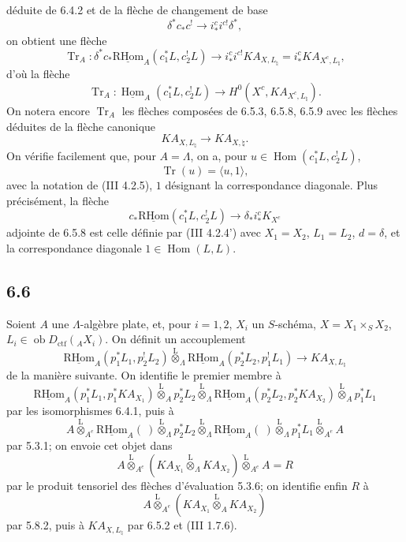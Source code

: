 \documentclass[11pt]{article}
\DeclareMathOperator{\Hom}{Hom}
\newcommand{\R}{\mathrm{R}}\newcommand{\RHomCore}{\mathrm{RHom}}
\providecommand{\RHom}{\RHomCore}
\providecommand{\uRHom}{\underline{\RHom}}
\providecommand{\uHom}{\underline{\Hom}}
\providecommand{\Tr}{\operatorname{Tr}}
\providecommand{\Tr}{\operatorname{Tr}}
\providecommand{\lten}{\overset{\mathrm L}{\otimes}}
\providecommand{\Ob}{\operatorname{ob}}
\providecommand{\Tr}{\operatorname{Tr}}
\providecommand{\RHom}{\RHomCore}
\providecommand{\Hom}{\operatorname{Hom}}
\providecommand{\lten}{\overset{\mathrm L}{\otimes}}
\providecommand{\RHom}{\R\mathcal{H}om}
\providecommand{\lten}{\overset{\mathrm L}{\otimes}}
\providecommand{\Ob}{\operatorname{ob}}
\providecommand{\R}{\mathrm R}
\providecommand{\Tr}{\operatorname{Tr}}
\providecommand{\lten}{\overset{\mathrm L}{\otimes}}
\providecommand{\lten}{\overset{\mathrm L}{\otimes}}
\providecommand{\Ob}{\operatorname{Ob}}
\providecommand{\lten}{\overset{\mathrm L}{\otimes}}
\providecommand{\RHom}{\RHomCore}
\providecommand{\Hom}{\operatorname{Hom}}
\providecommand{\Tr}{\operatorname{Tr}}
\providecommand{\Ob}{\operatorname{ob}}
\providecommand{\Ob}{\operatorname{Ob}}
\providecommand{\lten}{\overset{\mathrm L}{\otimes}}
\begin{document}
déduite de 6.4.2 et de la flèche de changement de base
\[
\delta^*c_*c^!\longrightarrow i_*^ci^{c!}\delta^*,
\]
on obtient une flèche
\begin{equation}
\Tr_A:\delta^*c_*\uRHom_A(c_1^*L,c_2^!L)
\longrightarrow
i_*^ci^{c!}KA_{X,L_{\natural}}
=i_*^cKA_{X^c,L_{\natural}},
\tag{6.5.8}
\end{equation}
d'où la flèche
\begin{equation}
\Tr_A:\uHom_A(c_1^*L,c_2^!L)
\longrightarrow
H^0(X^c,KA_{X^c,L_{\natural}}).
\tag{6.5.9}
\end{equation}
On notera encore $\Tr_A$ les flèches composées de 6.5.3, 6.5.8, 6.5.9 avec les flèches déduites de la flèche canonique
\[
KA_{X,L_{\natural}}\longrightarrow KA_{X,\natural}.
\]
On vérifie facilement que, pour $A=\Lambda$, on a, pour $u\in\Hom(c_1^*L,c_2^!L)$,
\begin{equation}
\Tr(u)=\langle u,1\rangle,
\tag{6.5.10}
\end{equation}
avec la notation de (III 4.2.5), $1$ désignant la correspondance diagonale. Plus précisément, la flèche
\[
c_*\uRHom(c_1^*L,c_2^!L)\longrightarrow \delta_*i_*^cK_{X^c}
\]
adjointe de 6.5.8 est celle définie par (III 4.2.4') avec $X_1=X_2$, $L_1=L_2$, $d=\delta$, et la correspondance diagonale $1\in\Hom(L,L)$.

\subsection*{6.6}
Soient $A$ une $\Lambda$-algèbre plate, et, pour $i=1,2$, $X_i$ un $S$-schéma, $X=X_1\times_SX_2$, $L_i\in\Ob D_{\mathrm{ctf}}({}_AX_i)$. On définit un accouplement
\begin{equation}
\uRHom_A(p_1^*L_1,p_2^!L_2)
\lten_{\Lambda}
\uRHom_A(p_2^*L_2,p_1^!L_1)
\longrightarrow
KA_{X,L_{\natural}}
\tag{6.6.1}
\end{equation}
de la manière suivante. On identifie le premier membre à
\[
\uRHom_A(p_1^*L_1,p_1^*KA_{X_1})
\lten_A p_2^*L_2
\lten_{\Lambda}
\uRHom_A(p_2^*L_2,p_2^*KA_{X_2})
\lten_A p_1^*L_1
\]
par les isomorphismes 6.4.1, puis à
\[
A\lten_{A^e}\uRHom_A(\ )\lten_{\Lambda}p_2^*L_2
 \lten_{\Lambda}\uRHom_A(\ )\lten_{\Lambda}p_1^*L_1\lten_{A^e}A
\]
par 5.3.1; on envoie cet objet dans
\[
A\lten_{A^e}(KA_{X_1}\lten_{\Lambda}KA_{X_2})\lten_{A^e}A=R
\]
par le produit tensoriel des flèches d'évaluation 5.3.6; on identifie enfin $R$ à
\[
A\lten_{A^e}(KA_{X_1}\lten_A KA_{X_2})
\]
par 5.8.2, puis à $KA_{X,L_{\natural}}$ par 6.5.2 et (III 1.7.6).
\end{document}
